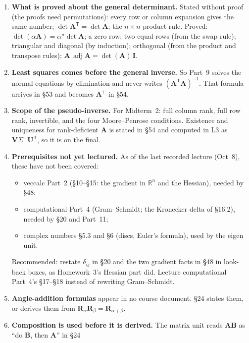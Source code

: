 \documentclass[11pt]{article}
\newcommand{\R}{\mathbb{R}}
\newcommand{\mt}[1]{\mathbf{#1}}
\newcommand{\T}{^{\mathsf{T}}}
\DeclareMathOperator{\adj}{adj}
\begin{document}
\begin{enumerate}[label=\textbf{D\arabic*.},leftmargin=2.4em,itemsep=5pt]
        computational proof by counting pivots.
  \item \textbf{What is proved about the general determinant.} Stated without
        proof (the proofs need permutations): every row or column expansion
        gives the same number; $\det\mt{A}\T=\det\mt{A}$; the $n\times n$
        product rule. Proved: $\det(\alpha\mt{A})=\alpha^{n}\det\mt{A}$; a zero
        row; two equal rows (from the swap rule); triangular and diagonal (by
        induction); orthogonal (from the product and transpose rules);
        $\mt{A}\,\adj\mt{A}=\det(\mt{A})\,\mt{I}$.
  \item \textbf{Least squares comes before the general inverse.} So Part~9
        solves the normal equations by elimination and never writes
        $(\mt{A}\T\mt{A})^{-1}$. That formula arrives in \S53 and becomes
        $\mt{A}^{+}$ in \S54.
  \item \textbf{Scope of the pseudo-inverse.} For Midterm~2: full column rank,
        full row rank, invertible, and the four Moore--Penrose conditions.
        Existence and uniqueness for rank-deficient $\mt{A}$ is stated in \S54
        and computed in L3 as $\mt{V}\Sigma^{+}\mt{U}\T$, so it is on the final.
  \item \textbf{Prerequisites not yet lectured.} As of the last recorded lecture
        (Oct~8), these have not been covered:
        \begin{itemize}[leftmargin=1.2em]
          \item veccalc Part~2 (\S10--\S15: the gradient in $\R^{n}$ and the
                Hessian), needed by \S48;
          \item computational Part~4 (Gram--Schmidt; the Kronecker delta of
                \S16.2), needed by \S20 and Part~11;
          \item complex numbers \S5.3 and \S6 (discs, Euler's formula), used by
                the eigen unit.
        \end{itemize}
        Recommended: restate $\delta_{ij}$ in \S20 and the two gradient facts in
        \S48 in look-back boxes, as Homework~3's Hessian part did. Lecture
        computational Part~4's \S17--\S18 instead of rewriting Gram--Schmidt.
  \item \textbf{Angle-addition formulas} appear in no course document. \S24
        states them, or derives them from
        $\mt{R}_\alpha\mt{R}_\beta=\mt{R}_{\alpha+\beta}$.
  \item \textbf{Composition is used before it is derived.} The matrix unit
        reads $\mt{A}\mt{B}$ as ``do $\mt{B}$, then $\mt{A}$'' in \S24

\end{enumerate}
\end{document}
